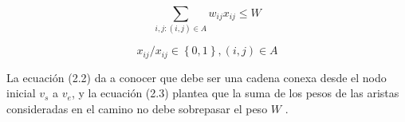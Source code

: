 \begin{equation}
\sum_{i,j: (i,j) \in A}^{}{w_{ij}x_{ij}} \leq W
\end{equation}

\begin{equation}
x_{ij} /x_{ij} \in  \left \{0,1 \right \} , (i,j)  \in A
\end{equation}

La ecuación (2.2) da a conocer que debe ser una cadena conexa desde el nodo inicial $v_s$ a $v_e$, y la ecuación (2.3) plantea que la suma de los pesos de las aristas consideradas en el camino no debe sobrepasar el peso $W$ \citep{santos2007improved}.





